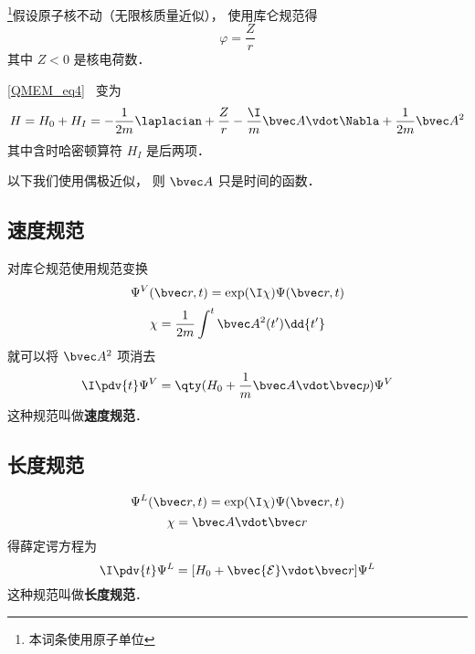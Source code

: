
\begin{issues}
\issueAbstract
\end{issues}


\footnote{本词条使用原子单位}假设原子核不动（无限核质量近似）， 使用库仑规范得
\begin{equation}
\varphi = \frac{Z}{r}
\end{equation}
其中 $Z < 0$ 是核电荷数．

\autoref{QMEM_eq4}~ 变为
\begin{equation}
H = H_0 + H_I = -\frac{1}{2m} \laplacian +  \frac{Z}{r} - \frac{\I}{m} \bvec A \vdot \Nabla + \frac{1}{2m} \bvec A^2
\end{equation}
其中含时哈密顿算符 $H_I$ 是后两项．

以下我们使用偶极近似， 则 $\bvec A$ 只是时间的函数．

\subsection{速度规范}
 对库仑规范使用规范变换
\begin{equation}\label{EMHydr_eq3}
\Psi^V(\bvec r, t) =  \exp(\I \chi) \Psi(\bvec r, t)
\end{equation}
\begin{equation}\label{EMHydr_eq4}
\chi = \frac{1}{2m} \int^t \bvec A^2(t') \dd{t'}
\end{equation}
就可以将 $\bvec A^2$ 项消去
\begin{equation}
\I \pdv{t} \Psi^V = \qty(H_0 + \frac{1}{m} \bvec A \vdot \bvec p) \Psi^V
\end{equation}
这种规范叫做\textbf{速度规范}．

\subsection{长度规范}

\begin{equation}
\Psi^L(\bvec r, t) =  \exp(\I \chi) \Psi(\bvec r, t)
\end{equation}
\begin{equation}
\chi = \bvec A \vdot \bvec r
\end{equation}
得薛定谔方程为
\begin{equation}
\I \pdv{t} \Psi^L = [H_0 + \bvec{\mathcal{E}} \vdot \bvec r] \Psi^L
\end{equation}
这种规范叫做\textbf{长度规范}．
